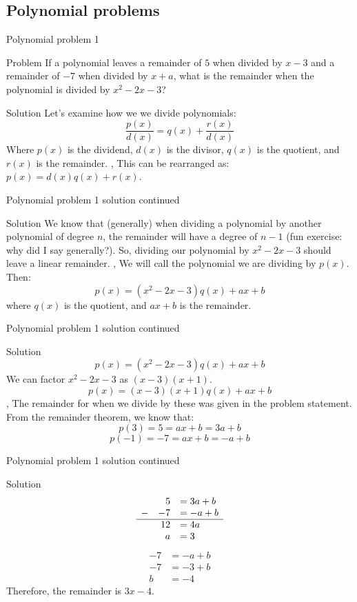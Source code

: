 \subsection{Polynomial problems}
\begin{namedframe}{Polynomial problem 1}
	\begin{exampleblock}{Problem}
		If a polynomial leaves a remainder of $5$ when divided by $x-3$ and a remainder of $-7$ when divided by $x + a$, what is the remainder when the polynomial is divided by $x^2 - 2x - 3$?
	\end{exampleblock}
	\pause
	\begin{block}{Solution}
		Let's examine how we we divide polynomials:
		\[\frac{p(x)}{d(x)} = q(x) + \frac{r(x)}{d(x)}\]
		Where $p(x)$ is the dividend, $d(x)$ is the divisor, $q(x)$ is the quotient, and $r(x)$ is the remainder.
		\sep
		This can be rearranged as: $p(x) = d(x)q(x) + r(x)$.
	\end{block}
\end{namedframe}
\begin{namedframe}{Polynomial problem 1 solution continued}
	\begin{block}{Solution}
		We know that (generally) when dividing a polynomial by another polynomial of degree $n$, the remainder will have a degree of $n - 1$ (fun exercise: why did I say generally?).
		\pause
		So, dividing our polynomial by $x^2 -2x - 3$ should leave a linear remainder.
		\sep
		We will call the polynomial we are dividing by $p(x)$. Then:
		\[p(x) = (x^2 - 2x - 3)q(x) + ax + b\]
		where $q(x)$ is the quotient, and $ax + b$ is the remainder.
	\end{block}
\end{namedframe}
\begin{namedframe}{Polynomial problem 1 solution continued}
	\begin{block}{Solution}
		\[p(x) = (x^2 - 2x - 3)q(x) + ax + b\]
		We can factor $x^2 - 2x - 3$ as $(x - 3)(x + 1)$.
		\[p(x) = (x - 3)(x + 1)q(x) + ax + b\]
		\sep
		The remainder for when we divide by these was given in the problem statement.
		From the remainder theorem, we know that:
		\[p(3)  = 5  = ax + b = 3a + b\]
		\[p(-1) = -7 = ax + b = -a + b\]
	\end{block}
\end{namedframe}
\begin{namedframe}{Polynomial problem 1 solution continued}
	\begin{block}{Solution}
		\begin{equation*}
			\begin{array}{lrl}
				  & 5  &= 3a + b\\
				- & -7 &= -a + b\\\hline
				  & 12 &= 4a\\
				  & a  &= 3
			\end{array}
		\end{equation*}
		\pause
		\begin{align*}
			-7 &= -a + b\\
			-7 &= -3 + b\\
			b  &=  -4
		\end{align*}
		\pause
		Therefore, the remainder is $3x - 4$.
	\end{block}
\end{namedframe}
